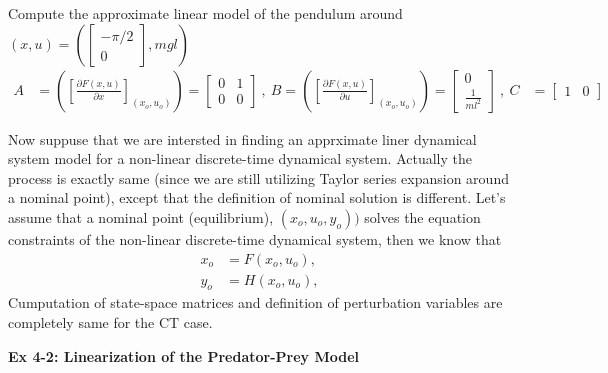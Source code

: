 \documentclass[twoside]{article}
\begin{document}
%
Compute the approximate linear model of the pendulum around $(x,u) =
\left( \left[ \begin{array}{c} -\pi/2 \\ 0 \end{array} \right] , m g l \right)$
%
\begin{align*}
A &= \left( \left[ \frac{\partial F(x,u)}{\partial x}
                      \right]_{(x_o,u_o)} \right) =
                    \left[ \begin{array}{cc} 0 & 1 \\ 0 & 0 \end{array}  \right]
\ , \ B = \left( \left[ \frac{\partial F(x,u)}{\partial u}
                      \right]_{(x_o,u_o)} \right) =
                                                            \left[ \begin{array}{c}
                                                                     0
                                                                     \\
                                                                     \frac{1}{m
                                                                     l^2}  \end{array}  \right]
\ , \
C &= \left[ \begin{array}{cc} 1 & 0 \end{array}  \right]
\end{align*}

Now suppuse that we are intersted in finding an apprximate liner
dynamical system model for a non-linear discrete-time dynamical
system. Actually the process is exactly same (since we are still
utilizing Taylor series expansion around a nominal point), except that 
the definition of nominal solution is different. Let's assume that 
a nominal point (equilibrium), $(x_o,u_o,y_o))$ solves the equation
constraints of the non-linear discrete-time dynamical system, then 
we know that
\begin{align*}
  x_o &= F(x_o,u_o) , \\
  y_o &= H(x_o,u_o) , 
\end{align*}
%
Cumputation of state-space matrices and definition of perturbation
variables are completely same for the CT case. 
%

\vspace{12pt}

\textbf{Ex 4-2: Linearization of the Predator-Prey Model}
\end{document}
